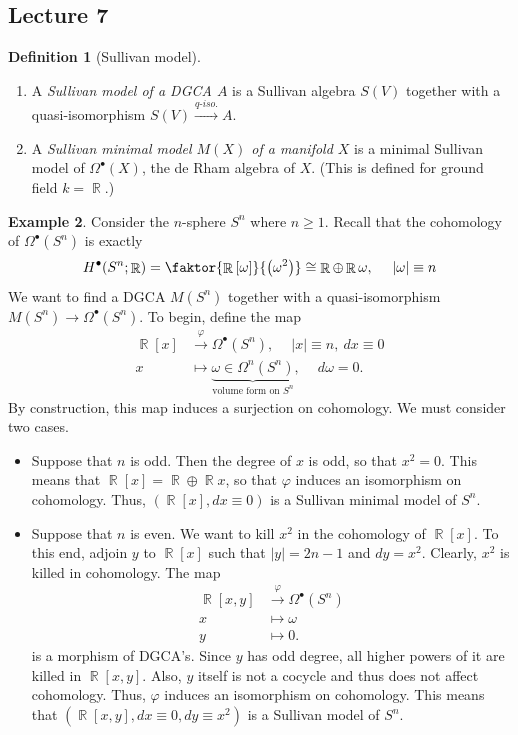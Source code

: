 \documentclass[10pt,letterpaper,cm]{nupset}
\theoremstyle{definition}
\newtheorem{defn}{Definition}[subsection]
\newtheorem{exmp}[defn]{Example}
\theoremstyle{theorem}
\theoremstyle{remark}
\DeclareMathOperator{\R}{\mathbb{R}}
\newcommand{\1}{\mathbb{1}}
\newcommand{\0}{\vec 0}
\newcommand{\bi}{\begin{itemize}}
\newcommand{\ei}{\end{itemize}}
\newcommand{\be}{\begin{enumerate}}
\newcommand{\ee}{\end{enumerate}}
\begin{document}
\subsection{Lecture 7}


\begin{defn}[Sullivan model] $ $
\be
\item A \textit{Sullivan model of a DGCA $A$} is a Sullivan algebra $S(V)$ together with a quasi-isomorphism \linebreak$S(V) \xrightarrow{\textit{q-iso.}} A$. 
\item A \textit{Sullivan minimal model $M(X)$ of a manifold $X$} is a minimal Sullivan model of $\Omega^{\bullet}(X)$, the de Rham algebra of $X$. (This is defined for ground field $k = \R$.)
\ee
\end{defn}


\begin{exmp}\label{Sull1}
Consider the $n$-sphere $S^n$ where $n\geq 1$. Recall that the cohomology of $\Omega^{\bullet}(S^n)$ is exactly 
\[
H^{\bullet}(S^n; \R) = \faktor{\R\left[\omega\right]}{\left(\omega^2\right)} \cong \R \oplus \R{\omega}, \ \quad  \left\lvert{\omega}\right\rvert \equiv n
\] We want to find a DGCA $M(S^n)$ together with a quasi-isomorphism $M(S^n) \to \Omega^{\bullet}(S^n)$. To begin, define the map 
\begin{align*}
\R\left[x\right] &  \xrightarrow{\varphi} \Omega^{\bullet}(S^n), \ \quad \left\lvert{x}\right\rvert \equiv n, \ d{x} \equiv 0
\\ x & \mapsto \underbrace{\omega \in \Omega^n(S^n)}_{\text{volume form on $S^n$}}, \ \quad d{\omega} =0.
\end{align*}
By construction, this map induces a surjection on cohomology. We must consider two cases.
\bi
\item Suppose that $n$ is odd. Then the degree of $x$ is odd, so that $x^2 =0$. This means that $\R\left[x\right] = \R \oplus \R{x}$, so that  $\varphi$ induces an isomorphism  on cohomology. Thus, $\left(\R\left[x\right], d{x} \equiv 0\right)$ is a Sullivan minimal model of $S^n$. 
\item Suppose that $n$ is even. We want to kill $x^2$ in the  cohomology of $\R\left[x\right]$. To this end, adjoin $y$ to $\R\left[x\right]$ such that $\left\lvert{y}\right\rvert = 2n-1$ and $d{y} = x^2$. Clearly, $x^2$ is killed in cohomology. The map
\begin{align*}
\R\left[x, y\right] &  \xrightarrow{\varphi}  \Omega^{\bullet}(S^n)
\\ x & \mapsto \omega
\\ y & \mapsto 0.
\end{align*} is a morphism of DGCA's.
Since $y$ has odd degree, all higher powers of it are killed in $\R\left[x, y\right]$. Also, $y$ itself is not a cocycle and thus does not affect cohomology. Thus, $\varphi$ induces an isomorphism on cohomology. This means that $\left(\R\left[x,y\right], d{x} \equiv 0, d{y} \equiv x^2\right)$ is a Sullivan model of $S^n$.
\ei
\end{exmp}
\end{document}
